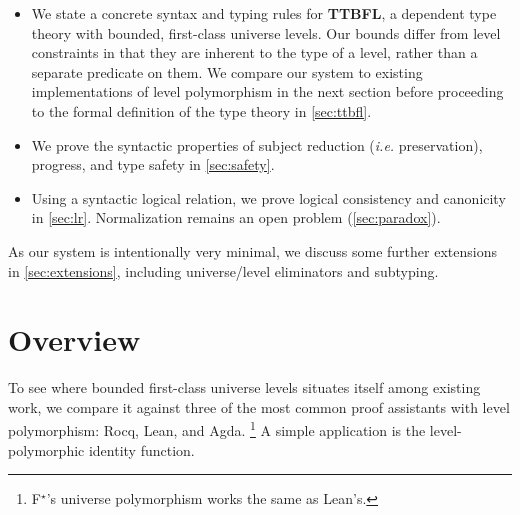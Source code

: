 \documentclass[a4paper,UKenglish,cleveref,autoref,thm-restate]{lipics-v2021}
\makeatletter
\newcommand{\lang}{TTBFL\@\xspace}
\newcommand{\ie}{\textit{i.e.}\@\xspace}
\newcommand{\fstar}{F$^\star$\@\xspace}
\makeatother
\begin{document}
\begin{itemize}
  \item We state a concrete syntax and typing rules for \textbf{\lang},
    a dependent type theory with bounded, first-class universe levels.
    Our bounds differ from level constraints in that
    they are inherent to the type of a level,
    rather than a separate predicate on them.
    We compare our system to existing implementations of level polymorphism in the next section
    before proceeding to the formal definition of the type theory in \cref{sec:ttbfl}.
  \item We prove the syntactic properties of subject reduction (\ie preservation),
    progress, and type safety in \cref{sec:safety}.
  \item Using a syntactic logical relation,
    we prove logical consistency and canonicity in \cref{sec:lr}.
    Normalization remains an open problem (\cref{sec:paradox}).
\end{itemize}

As our system is intentionally very minimal,
we discuss some further extensions in \cref{sec:extensions},
including universe/level eliminators and subtyping.

\section{Overview}

To see where bounded first-class universe levels situates itself among existing work,
we compare it against three of the most common proof assistants with level polymorphism:
Rocq, Lean, and Agda.%
\footnote{\fstar's universe polymorphism works the same as Lean's.}
A simple application is the level-polymorphic identity function.
\end{document}

